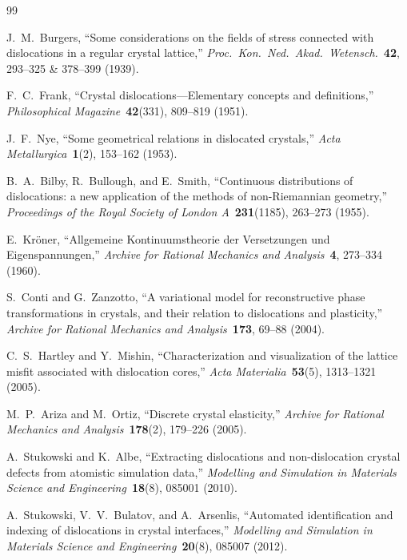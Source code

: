 \documentclass[11pt,a4paper]{article}
\begin{document}
\begin{thebibliography}{99}

J.~M.~Burgers,
``Some considerations on the fields of stress connected with dislocations in a regular crystal lattice,''
\emph{Proc.\ Kon.\ Ned.\ Akad.\ Wetensch.}\ \textbf{42}, 293--325 \& 378--399 (1939).

F.~C.~Frank,
``Crystal dislocations---Elementary concepts and definitions,''
\emph{Philosophical Magazine}\ \textbf{42}(331), 809--819 (1951).

J.~F.~Nye,
``Some geometrical relations in dislocated crystals,''
\emph{Acta Metallurgica}\ \textbf{1}(2), 153--162 (1953).

B.~A.~Bilby, R.~Bullough, and E.~Smith,
``Continuous distributions of dislocations: a new application of the methods of non-Riemannian geometry,''
\emph{Proceedings of the Royal Society of London A}\ \textbf{231}(1185), 263--273 (1955).

E.~Kr\"oner,
``Allgemeine Kontinuumstheorie der Versetzungen und Eigenspannungen,''
\emph{Archive for Rational Mechanics and Analysis}\ \textbf{4}, 273--334 (1960).

S.~Conti and G.~Zanzotto,
``A variational model for reconstructive phase transformations in crystals, and their relation to dislocations and plasticity,''
\emph{Archive for Rational Mechanics and Analysis}\ \textbf{173}, 69--88 (2004).

C.~S.~Hartley and Y.~Mishin,
``Characterization and visualization of the lattice misfit associated with dislocation cores,''
\emph{Acta Materialia}\ \textbf{53}(5), 1313--1321 (2005).

M.~P.~Ariza and M.~Ortiz,
``Discrete crystal elasticity,''
\emph{Archive for Rational Mechanics and Analysis}\ \textbf{178}(2), 179--226 (2005).

A.~Stukowski and K.~Albe,
``Extracting dislocations and non-dislocation crystal defects from atomistic simulation data,''
\emph{Modelling and Simulation in Materials Science and Engineering}\ \textbf{18}(8), 085001 (2010).

A.~Stukowski, V.~V.~Bulatov, and A.~Arsenlis,
``Automated identification and indexing of dislocations in crystal interfaces,''
\emph{Modelling and Simulation in Materials Science and Engineering}\ \textbf{20}(8), 085007 (2012).

\end{thebibliography}
\end{document}
